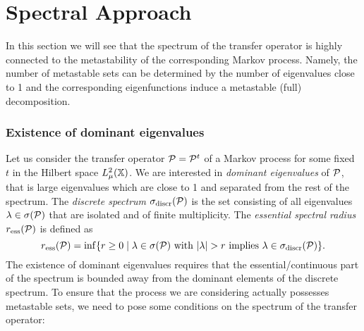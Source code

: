 \section{Spectral Approach}
\label{sec:spectral}

In this section we will see that the spectrum of the transfer operator is highly connected to the metastability of the corresponding Markov process.
Namely, the number of metastable sets can be determined by the number of eigenvalues close to 1 and the corresponding eigenfunctions induce a metastable (full) decomposition.




\subsubsection*{Existence of dominant eigenvalues}


Let us consider the transfer operator $\mathcal{P} = \mathcal{P}^t$ of a Markov process for some fixed $t$ in the Hilbert space $L_\mu^2(\mathbb{X})$. 
We are interested in \textit{dominant eigenvalues} of $\mathcal{P}$, that is large eigenvalues which are close to 1 and separated from the rest of the spectrum.
The \textit{discrete spectrum} $\sigma_{\mathrm{discr}}(\mathcal{P})$ is the set consisting of all eigenvalues $\lambda \in \sigma(\mathcal{P})$ that are isolated and of finite multiplicity.
The \textit{essential spectral radius} $r_{\mathrm{ess}}(\mathcal{P})$ is defined as
\begin{equation*}
r_{\mathrm{ess}}(\mathcal{P}) = \inf \{ r \geq 0 \mid \lambda \in \sigma(\mathcal{P}) \textrm{ with } |\lambda| > r \textrm{ implies } \lambda \in \sigma_{\mathrm{discr}}(\mathcal{P}) \}.
\end{equation*}
The existence of dominant eigenvalues requires that the essential/continuous part of the spectrum is bounded away from the dominant elements of the discrete spectrum.
To ensure that the process we are considering actually possesses metastable sets, we need to pose some conditions on the spectrum of the transfer operator:

